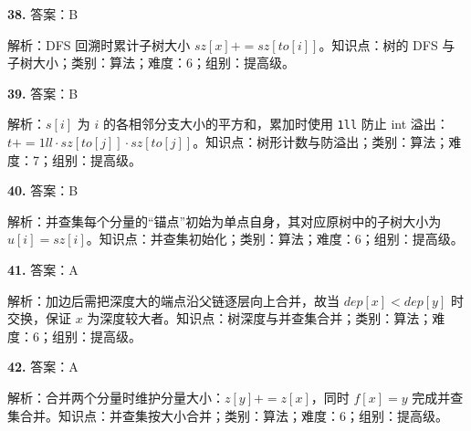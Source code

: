 \documentclass[a4paper]{ctexart}
\newcommand{\ans}[2]{\noindent\textbf{#1} \quad 答案：#2\par}
\newcommand{\expn}[1]{\hspace*{1.5em} 解析：#1\par}
\begin{document}
\ans{38.}{B}
\expn{DFS 回溯时累计子树大小 $sz[x] += sz[to[i]]$。\quad 知识点：树的 DFS 与子树大小；类别：算法；难度：6；组别：提高级。}

\ans{39.}{B}
\expn{$s[i]$ 为 $i$ 的各相邻分支大小的平方和，累加时使用 \texttt{1ll} 防止 int 溢出：$t += 1ll\cdot sz[to[j]]\cdot sz[to[j]]$。\quad 知识点：树形计数与防溢出；类别：算法；难度：7；组别：提高级。}

\ans{40.}{B}
\expn{并查集每个分量的“锚点”初始为单点自身，其对应原树中的子树大小为 $u[i]=sz[i]$。\quad 知识点：并查集初始化；类别：算法；难度：6；组别：提高级。}

\ans{41.}{A}
\expn{加边后需把深度大的端点沿父链逐层向上合并，故当 $dep[x]<dep[y]$ 时交换，保证 $x$ 为深度较大者。\quad 知识点：树深度与并查集合并；类别：算法；难度：6；组别：提高级。}

\ans{42.}{A}
\expn{合并两个分量时维护分量大小：$z[y] += z[x]$，同时 $f[x]=y$ 完成并查集合并。\quad 知识点：并查集按大小合并；类别：算法；难度：6；组别：提高级。}

\clearpage
\end{document}
